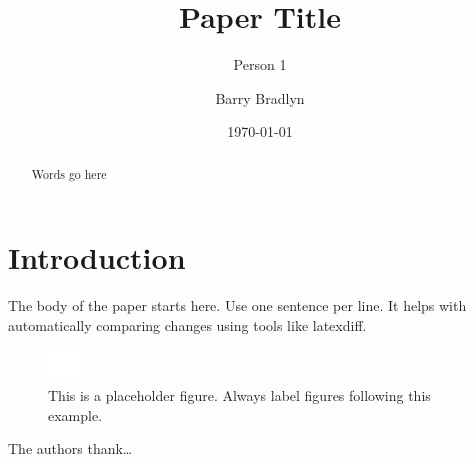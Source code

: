 \documentclass[prb,aps,amssymb,twocolumn,superscriptaddress,notitlepage]{revtex4-2}
\begin{document}
\title{Paper Title}
\author{Person 1}

\author{Barry Bradlyn}

\date{\today}

\begin{abstract}
Words go here
\end{abstract}
\maketitle

\section{Introduction}
The body of the paper starts here.
Use one sentence per line.
It helps with automatically comparing changes using tools like latexdiff. 

\begin{figure}[ht]
\includegraphics[width=\columnwidth]{placeholder.png}
\caption{This is a placeholder figure. 
Always label figures following this example.}\label{fig:placeholder}
\end{figure}

\begin{acknowledgments}
The authors thank\dots
\end{acknowledgments}



\end{document}

